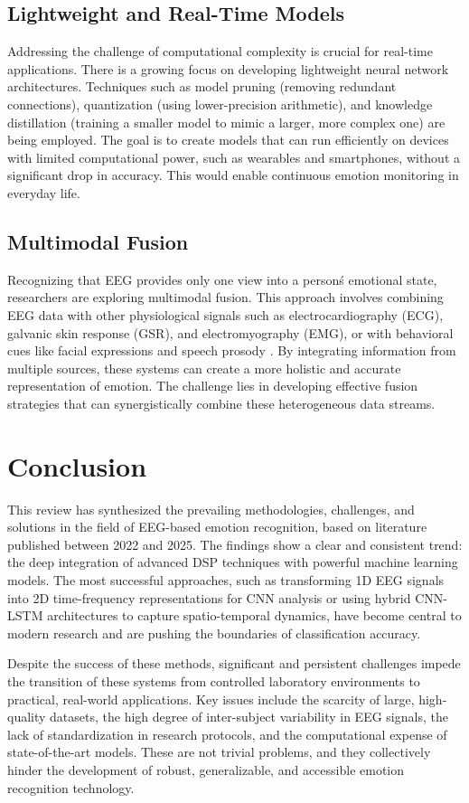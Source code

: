 \documentclass[conference]{IEEEtran}
\begin{document}
\subsection*{Lightweight and Real-Time Models}
Addressing the challenge of computational complexity is crucial for real-time applications. There is a growing focus on developing lightweight neural network architectures. Techniques such as model pruning (removing redundant connections), quantization (using lower-precision arithmetic), and knowledge distillation (training a smaller model to mimic a larger, more complex one) are being employed. The goal is to create models that can run efficiently on devices with limited computational power, such as wearables and smartphones, without a significant drop in accuracy. This would enable continuous emotion monitoring in everyday life.

\subsection*{Multimodal Fusion}
Recognizing that EEG provides only one view into a person\'s emotional state, researchers are exploring multimodal fusion. This approach involves combining EEG data with other physiological signals such as electrocardiography (ECG), galvanic skin response (GSR), and electromyography (EMG), or with behavioral cues like facial expressions and speech prosody \cite{b1, b5}. By integrating information from multiple sources, these systems can create a more holistic and accurate representation of emotion. The challenge lies in developing effective fusion strategies that can synergistically combine these heterogeneous data streams.

\section{Conclusion}
This review has synthesized the prevailing methodologies, challenges, and solutions in the field of EEG-based emotion recognition, based on literature published between 2022 and 2025. The findings show a clear and consistent trend: the deep integration of advanced DSP techniques with powerful machine learning models. The most successful approaches, such as transforming 1D EEG signals into 2D time-frequency representations for CNN analysis or using hybrid CNN-LSTM architectures to capture spatio-temporal dynamics, have become central to modern research and are pushing the boundaries of classification accuracy.

Despite the success of these methods, significant and persistent challenges impede the transition of these systems from controlled laboratory environments to practical, real-world applications. Key issues include the scarcity of large, high-quality datasets, the high degree of inter-subject variability in EEG signals, the lack of standardization in research protocols, and the computational expense of state-of-the-art models. These are not trivial problems, and they collectively hinder the development of robust, generalizable, and accessible emotion recognition technology.
\end{document}
